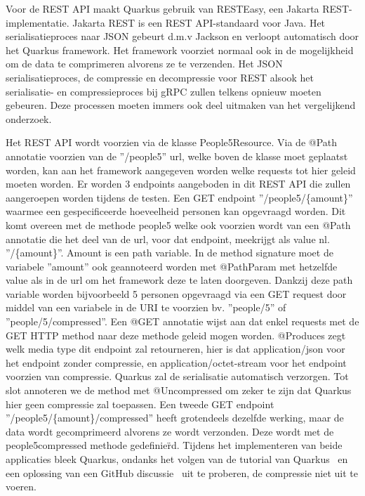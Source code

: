 Voor de REST API maakt Quarkus gebruik van RESTEasy, een Jakarta REST-implementatie. Jakarta REST is een REST API-standaard voor Java.
Het serialisatieproces naar JSON gebeurt d.m.v Jackson en verloopt automatisch door het Quarkus framework.
Het framework voorziet normaal ook in de mogelijkheid om de data te comprimeren alvorens ze te verzenden.
Het JSON serialisatieproces, de compressie en decompressie voor REST alsook het serialisatie- en compressieproces bij gRPC zullen telkens opnieuw moeten gebeuren.
Deze processen moeten immers ook deel uitmaken van het vergelijkend onderzoek.\newline

Het REST API wordt voorzien via de klasse People5Resource. Via de @Path annotatie voorzien van de ''/people5'' url, welke boven de klasse moet geplaatst worden,
kan aan het framework aangegeven worden welke requests tot hier geleid moeten worden.
Er worden 3 endpoints aangeboden in dit REST API die zullen aangeroepen worden tijdens de testen. Een GET endpoint ''/people5/\{amount\}'' waarmee een gespecificeerde hoeveelheid
personen kan opgevraagd worden. Dit komt overeen met de methode people5 welke ook voorzien wordt van een @Path annotatie
die het deel van de url, voor dat endpoint, meekrijgt als value nl. ''/\{amount\}''. Amount is een path variable. In de method signature moet de variabele ''amount''
ook geannoteerd worden met @PathParam met hetzelfde value als in de url om het framework deze te laten doorgeven.
Dankzij deze path variable worden bijvoorbeeld 5 personen opgevraagd via een GET request door middel van een variabele in de URI te voorzien bv.
''people/5'' of ''people/5/compressed''.
Een @GET annotatie wijst aan dat enkel requests met de GET HTTP method naar deze methode geleid mogen worden.
@Produces zegt welk media type dit endpoint zal retourneren, hier is dat application/json voor het endpoint zonder compressie, en application/octet-stream voor het endpoint voorzien van compressie.
Quarkus zal de serialisatie automatisch verzorgen. Tot slot annoteren we de method met @Uncompressed om zeker te zijn dat Quarkus hier geen compressie zal toepassen.
Een tweede GET endpoint ''/people5/\{amount\}/compressed'' heeft grotendeels dezelfde werking, maar de data wordt gecomprimeerd alvorens ze wordt verzonden.
Deze wordt met de people5compressed methode gedefinie\"rd. \newline
Tijdens het implementeren van beide applicaties bleek Quarkus, ondanks het volgen van de tutorial van Quarkus~\parencite{quarkusgzipcompressie}
en een oplossing van een GitHub discussie~\parencite{quarkusgzipcompressiegithub} uit te proberen, de compressie niet uit te voeren.
